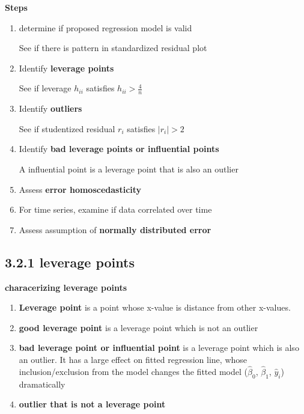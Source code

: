 \documentclass[11pt]{article}
\begin{document}
\begin{defn*}
    \textbf{Steps}
    \begin{enumerate}
        \item determine if proposed regression model is valid
        \begin{center}
            See if there is pattern in standardized residual plot
        \end{center}
        \item Identify \textbf{leverage points} 
        \begin{center}
            See if leverage $h_{ii}$ satisfies $h_{ii} > \frac{4}{n}$
        \end{center}
        \item Identify \textbf{outliers} 
        \begin{center}
            See if studentized residual $r_i$ satisfies $|r_i| > 2$
        \end{center}
        \item Identify \textbf{bad leverage points or influential points} 
        \begin{center}
            A influential point is a leverage point that is also an outlier
        \end{center}
        \item Assess \textbf{error homoscedasticity}
        \item For time series, examine if data correlated over time 
        \item Assess assumption of \textbf{normally distributed error} 
    \end{enumerate}
\end{defn*}

\subsection*{3.2.1 leverage points} 

\begin{defn*}
    \textbf{characerizing leverage points} \\
    \begin{enumerate}
        \item \textbf{Leverage point} is a point whose x-value is distance from other x-values.
        \item \textbf{good leverage point} is a leverage point which is not an outlier
        \item \textbf{bad leverage point or influential point} is a leverage point which is also an outlier. It has a large effect on fitted regression line, whose inclusion/exclusion from the model changes the fitted model ($\hat{\beta}_0$, $\hat{\beta}_1$, $\hat{y}_i$) dramatically
        \item \textbf{outlier that is not a leverage point} 
    \end{enumerate} 
\end{defn*}
\end{document}
